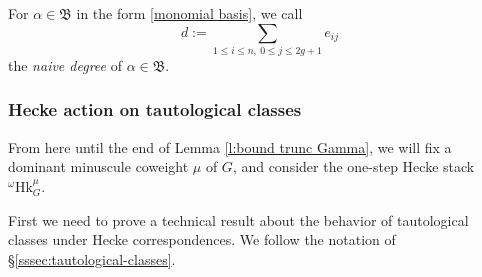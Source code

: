 \documentclass[reqno]{amsart}
\numberwithin{equation}{subsection}
\theoremstyle{definition}
\newcommand\frB{\mathfrak{B}}
\newcommand\Hk{\mathrm{Hk}}
\renewcommand\a\alpha
\newcommand{\om}{\omega}
\begin{document}
    
For $\a\in \frB$ in the form \eqref{monomial basis}, we call 
\begin{equation}\label{naive deg}
d:=\sum_{1\le i\le n, \ 0\le j\le 2g+1}e_{ij}
\end{equation}
the {\em naive degree} of $\a\in \frB$.
    

\subsubsection{Hecke action on tautological classes} 
From here until the end of Lemma \ref{l:bound trunc Gamma}, we will fix a dominant minuscule coweight $\mu$ of $G$, and consider the one-step Hecke stack ${}^{\om} \Hk^{\mu}_G$.  

First we need to prove a technical result about the behavior of tautological classes under Hecke correspondences. We follow the notation of \S \ref{sssec:tautological-classes}. 
\end{document}
